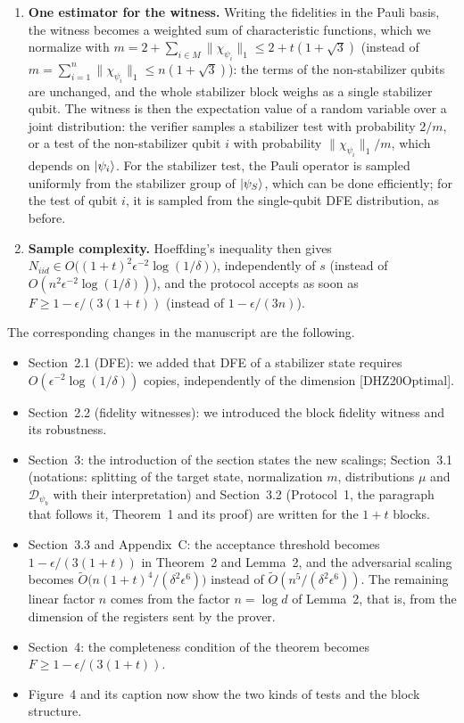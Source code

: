 \documentclass[a4paper,11pt]{article}
\newenvironment{Response}
{\noindent \color{RawSienna}{\bf Response:} }
{\medskip}
\begin{document}
\begin{Response}
\begin{enumerate}
    \item \textbf{One estimator for the witness.} Writing the fidelities in the Pauli basis, the witness becomes a weighted sum of characteristic functions, which we normalize with $m=2+\sum_{i\in M}\|\chi_{\psi_i}\|_1\le2+t(1+\sqrt3)$ (instead of $m=\sum_{i=1}^n\|\chi_{\psi_i}\|_1\le n(1+\sqrt3)$): the terms of the non-stabilizer qubits are unchanged, and the whole stabilizer block weighs as a single stabilizer qubit. The witness is then the expectation value of a random variable over a joint distribution: the verifier samples a stabilizer test with probability $2/m$, or a test of the non-stabilizer qubit $i$ with probability $\|\chi_{\psi_i}\|_1/m$, which depends on $\ket{\psi_i}$. For the stabilizer test, the Pauli operator is sampled uniformly from the stabilizer group of $\ket{\psi_S}$, which can be done efficiently; for the test of qubit $i$, it is sampled from the single-qubit DFE distribution, as before.

    \item \textbf{Sample complexity.} Hoeffding's inequality then gives $N_{iid}\in O\big((1+t)^2\epsilon^{-2}\log(1/\delta)\big)$, independently of $s$ (instead of $O(n^2\epsilon^{-2}\log(1/\delta))$), and the protocol accepts as soon as $F\ge1-\epsilon/(3(1+t))$ (instead of $1-\epsilon/(3n)$).
\end{enumerate}

\noindent The corresponding changes in the manuscript are the following.
\begin{itemize}
    \item Section~2.1 (DFE): we added that DFE of a stabilizer state requires $O(\epsilon^{-2}\log(1/\delta))$ copies, independently of the dimension [DHZ20Optimal].
    \item Section~2.2 (fidelity witnesses): we introduced the block fidelity witness and its robustness.
    \item Section~3: the introduction of the section states the new scalings; Section~3.1 (notations: splitting of the target state, normalization $m$, distributions $\mu$ and $\mathcal D_{\psi_b}$ with their interpretation) and Section~3.2 (Protocol~1, the paragraph that follows it, Theorem~1 and its proof) are written for the $1+t$ blocks.
    \item Section~3.3 and Appendix~C: the acceptance threshold becomes $1-\epsilon/(3(1+t))$ in Theorem~2 and Lemma~2, and the adversarial scaling becomes $\tilde O\big(n(1+t)^4/(\delta^2\epsilon^6)\big)$ instead of $\tilde O(n^5/(\delta^2\epsilon^6))$. The remaining linear factor $n$ comes from the factor $n=\log d$ of Lemma~2, that is, from the dimension of the registers sent by the prover.
    \item Section~4: the completeness condition of the theorem becomes $F\ge1-\epsilon/(3(1+t))$.
    \item Figure~4 and its caption now show the two kinds of tests and the block structure.
\end{itemize}
\end{Response}
\end{document}
